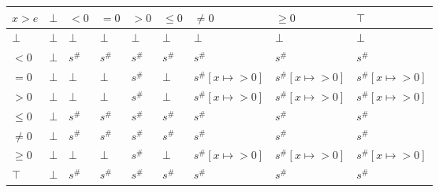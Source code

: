 \documentclass{article}
\begin{document}
                    \begin{table}
                        \begin{tabular}{|l|l|l|l|l|l|l|l|l|}
                        \hline
                        $x > e$ & $\bot$ & $<0$   & $=0$   & $>0$   & $\le 0$ & $\ne 0$              & $\ge 0$              & $\top$               \\ \hline
                        $\bot$  & $\bot$ & $\bot$ & $\bot$ & $\bot$ & $\bot$  & $\bot$               & $\bot$               & $\bot$               \\ \hline
                        $<0$    & $\bot$ & $s^\#$ & $s^\#$ & $s^\#$ & $s^\#$  & $s^\#$               & $s^\#$               & $s^\#$               \\ \hline
                        $=0$    & $\bot$ & $\bot$ & $\bot$ & $s^\#$ & $\bot$  & $s^\#[x \mapsto >0]$ & $s^\#[x \mapsto >0]$ & $s^\#[x \mapsto >0]$ \\ \hline
                        $>0$    & $\bot$ & $\bot$ & $\bot$ & $s^\#$ & $\bot$  & $s^\#[x \mapsto >0]$ & $s^\#[x \mapsto >0]$ & $s^\#[x \mapsto >0]$ \\ \hline
                        $\le 0$ & $\bot$ & $s^\#$ & $s^\#$ & $s^\#$ & $s^\#$  & $s^\#$               & $s^\#$               & $s^\#$               \\ \hline
                        $\ne 0$ & $\bot$ & $s^\#$ & $s^\#$ & $s^\#$ & $s^\#$  & $s^\#$               & $s^\#$               & $s^\#$               \\ \hline
                        $\ge 0$ & $\bot$ & $\bot$ & $\bot$ & $s^\#$ & $\bot$  & $s^\#[x \mapsto >0]$ & $s^\#[x \mapsto >0]$ & $s^\#[x \mapsto >0]$ \\ \hline
                        $\top$  & $\bot$ & $s^\#$ & $s^\#$ & $s^\#$ & $s^\#$  & $s^\#$               & $s^\#$               & $s^\#$               \\ \hline
                        \end{tabular}
                        \end{table}
\end{document}
